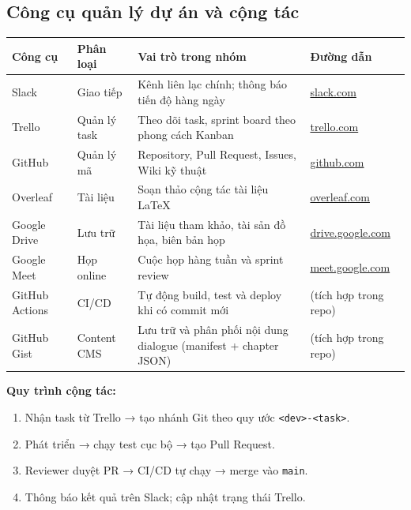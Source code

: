 \documentclass[12pt,a4paper]{article}
\begin{document}
\subsection{Công cụ quản lý dự án và cộng tác}

\begin{tabularx}{\linewidth}{|l|l|X|l|}
\hline
\rowcolor{gray!20}
\textbf{Công cụ} & \textbf{Phân loại} & \textbf{Vai trò trong nhóm} & \textbf{Đường dẫn} \\
\hline
Slack & Giao tiếp & Kênh liên lạc chính; thông báo tiến độ hàng ngày & \href{https://ss004f21.slack.com/archives/C0ANP80FNSZ}{slack.com} \\
\hline
Trello & Quản lý task & Theo dõi task, sprint board theo phong cách Kanban & \href{https://trello.com/b/jzxLVWjG/ctetris}{trello.com} \\
\hline
GitHub & Quản lý mã & Repository, Pull Request, Issues, Wiki kỹ thuật & \href{https://github.com/phuctanpham/ctetris}{github.com} \\
\hline
Overleaf & Tài liệu & Soạn thảo cộng tác tài liệu LaTeX & \href{https://www.overleaf.com/read/swpzbgqzpyqc}{overleaf.com} \\
\hline
Google Drive & Lưu trữ & Tài liệu tham khảo, tài sản đồ họa, biên bản họp & \href{https://drive.google.com/drive/folders/1ymKk4BAUBcXxKVpawqgOrsJHpHAze8I5}{drive.google.com} \\
\hline
Google Meet & Họp online & Cuộc họp hàng tuần và sprint review & \href{https://meet.google.com/owo-iige-rum}{meet.google.com} \\
\hline
GitHub Actions & CI/CD & Tự động build, test và deploy khi có commit mới & (tích hợp trong repo) \\
\hline
GitHub Gist & Content CMS & Lưu trữ và phân phối nội dung dialogue (manifest + chapter JSON) & (tích hợp trong repo) \\
\hline
\end{tabularx}

\vspace{4pt}
\noindent\textbf{Quy trình cộng tác:}
\begin{enumerate}[nosep]
    \item Nhận task từ Trello → tạo nhánh Git theo quy ước \texttt{<dev>-<task>}.
    \item Phát triển → chạy test cục bộ → tạo Pull Request.
    \item Reviewer duyệt PR → CI/CD tự chạy → merge vào \texttt{main}.
    \item Thông báo kết quả trên Slack; cập nhật trạng thái Trello.
\end{enumerate}
\end{document}
